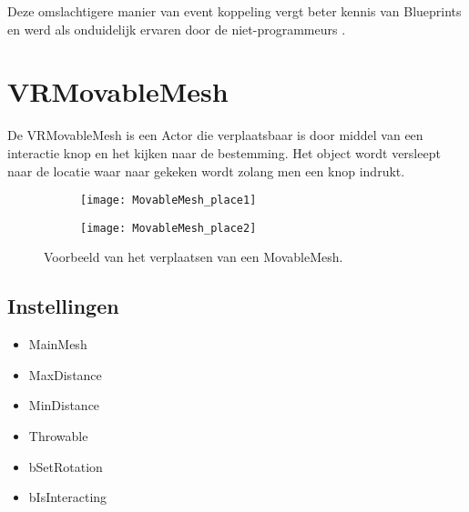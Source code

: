 Deze omslachtigere manier van event koppeling vergt beter kennis van Blueprints en werd als onduidelijk ervaren door de niet-programmeurs . 

\section{VRMovableMesh}
De VRMovableMesh is een Actor die verplaatsbaar is door middel van een interactie knop en het kijken naar de bestemming. Het object wordt versleept naar de locatie waar naar gekeken wordt zolang men een knop indrukt.

\begin{figure}[!ht]
  \centering
  	\begin{subfigure}[b]{\linewidth/3}
    	\texttt{[image: MovableMesh\_place1]}
    	\label{fig:a}
	\end{subfigure}

	\begin{subfigure}[b]{\linewidth/3}
    	\texttt{[image: MovableMesh\_place2]}
    	\label{fig:b}
	\end{subfigure}

	\caption{Voorbeeld van het verplaatsen van een MovableMesh.}
\end{figure}

\subsection{Instellingen}

\begin{itemize}
	\item MainMesh
	\item MaxDistance
	\item MinDistance
	\item Throwable
	\item bSetRotation
	\item bIsInteracting
\end{itemize}